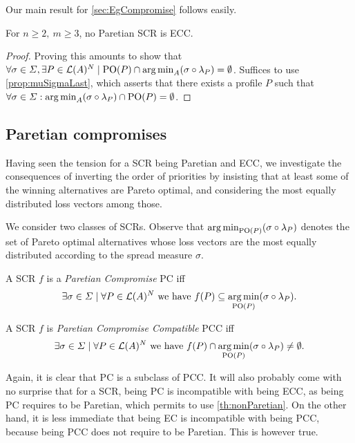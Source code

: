 Our main result for \cref{sec:EgCompromise} follows easily.
\begin{theorem} \label{th:nonParetian}
	For $n\geq 2, \ m\geq3$, no Paretian \ac{SCR} is ECC.
\end{theorem}
\begin{proof}
	Proving this amounts to show that $\forall \sigma \in \Sigma, \exists P \in \linors^N \suchthat \paretopt(P) \cap \musigma = \emptyset$. Suffices to use \cref{prop:muSigmaLast}, which asserts that there exists a profile $P$ such that $\forall \sigma \in \Sigma: \musigma \cap \paretopt(P) = \emptyset$.
\end{proof}

\subsection{Paretian compromises}
Having seen the tension for a \ac{SCR} being Paretian and ECC, we investigate the consequences of inverting the order of priorities by insisting that at least some of the winning alternatives are Pareto optimal, and considering the most equally distributed loss vectors among those.

We consider two classes of \acp{SCR}. 
Observe that $\mustar$ denotes the set of Pareto optimal alternatives whose loss vectors are the most equally distributed according to the spread measure $\sigma$.

\begin{definition} A \ac{SCR} $f$ is a \emph{Paretian Compromise} PC iff \[\exists \sigma \in \Sigma \suchthat \forall P \in \linors^N \text{ we have } f(P) \subseteq \mustar.\]
\end{definition}

\begin{definition} A \ac{SCR} $f$ is \emph{Paretian Compromise Compatible} PCC iff \[\exists \sigma \in \Sigma \suchthat \forall P \in \linors^N \text{ we have } f(P) \cap \mustar \neq \emptyset.\]
\end{definition}

Again, it is clear that PC is a subclass of PCC. It will also probably come with no surprise that for a \ac{SCR}, being PC is incompatible with being ECC, as being PC requires to be Paretian, which permits to use \cref{th:nonParetian}. On the other hand, it is less immediate that being EC is incompatible with
being PCC, because being PCC does not require to be Paretian. This is however true.

